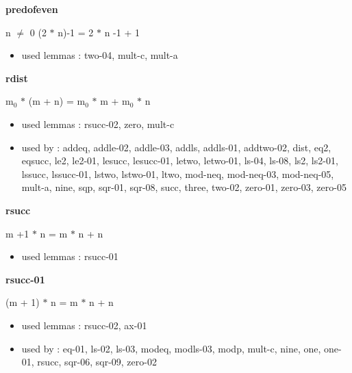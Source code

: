 \documentclass[a4paper]{article}
\begin{document}
\medskip

\bigskip

{\large\bf predofeven}

\medskip

n $\neq$ 0 \Fol (2 $*$ n)-1 = 2 $*$ n -1 + 1

\begin{itemize}


\item       used lemmas  : two-04, mult-c, mult-a

\end{itemize}

\medskip

\bigskip

{\large\bf rdist}

\medskip

 \Fol $\mbox{m}_{0}$ $*$ (m + n) = $\mbox{m}_{0}$ $*$ m + $\mbox{m}_{0}$ $*$ n

\begin{itemize}


\item       used lemmas  : rsucc-02, zero, mult-c
\item       used by      : addeq, addle-02, addle-03, addls, addls-01, addtwo-02, dist, eq2, eqsucc, le2, le2-01, lesucc, lesucc-01, letwo, letwo-01, ls-04, ls-08, ls2, ls2-01, lssucc, lssucc-01, lstwo, lstwo-01, ltwo, mod-neq, mod-neq-03, mod-neq-05, mult-a, nine, sqp, sqr-01, sqr-08, succ, three, two-02, zero-01, zero-03, zero-05

\end{itemize}

\medskip

\bigskip

{\large\bf rsucc}

\medskip

 \Fol m +1 $*$ n = m $*$ n + n

\begin{itemize}


\item       used lemmas  : rsucc-01

\end{itemize}

\medskip

\bigskip

{\large\bf rsucc-01}

\medskip

 \Fol (m + 1) $*$ n = m $*$ n + n

\begin{itemize}


\item       used lemmas  : rsucc-02, ax-01
\item       used by      : eq-01, ls-02, ls-03, modeq, modls-03, modp, mult-c, nine, one, one-01, rsucc, sqr-06, sqr-09, zero-02

\end{itemize}
\end{document}
